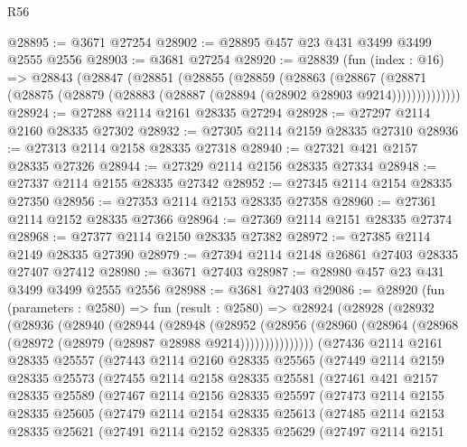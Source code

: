 \begin{lexlean}{R56}
\begin{coremodule}
@28895 := @3671 @27254
@28902 := @28895 @457 @23 @431 @3499 @3499 @2555 @2556
@28903 := @3681 @27254
@28920 := @28839
    (fun (index : @16) =>
    @28843
      (@28847
        (@28851
          (@28855
            (@28859
              (@28863
                (@28867
                  (@28871 (@28875 (@28879 (@28883 (@28887 (@28894 (@28902 @28903 @9214))))))))))))))
@28924 := @27288 @2114 @2161 @28335 @27294
@28928 := @27297 @2114 @2160 @28335 @27302
@28932 := @27305 @2114 @2159 @28335 @27310
@28936 := @27313 @2114 @2158 @28335 @27318
@28940 := @27321 @421 @2157 @28335 @27326
@28944 := @27329 @2114 @2156 @28335 @27334
@28948 := @27337 @2114 @2155 @28335 @27342
@28952 := @27345 @2114 @2154 @28335 @27350
@28956 := @27353 @2114 @2153 @28335 @27358
@28960 := @27361 @2114 @2152 @28335 @27366
@28964 := @27369 @2114 @2151 @28335 @27374
@28968 := @27377 @2114 @2150 @28335 @27382
@28972 := @27385 @2114 @2149 @28335 @27390
@28979 := @27394 @2114 @2148 @26861 @27403 @28335 @27407 @27412
@28980 := @3671 @27403
@28987 := @28980 @457 @23 @431 @3499 @3499 @2555 @2556
@28988 := @3681 @27403
@29086 := @28920
    (fun (parameters : @2580) =>
    fun (result : @2580) =>
    @28924
      (@28928
        (@28932
          (@28936
            (@28940
              (@28944
                (@28948
                  (@28952
                    (@28956
                      (@28960 (@28964 (@28968 (@28972 (@28979 (@28987 @28988 @9214)))))))))))))))
    (@27436
      @2114
      @2161
      @28335
      @25557
      (@27443
        @2114
        @2160
        @28335
        @25565
        (@27449
          @2114
          @2159
          @28335
          @25573
          (@27455
            @2114
            @2158
            @28335
            @25581
            (@27461
              @421
              @2157
              @28335
              @25589
              (@27467
                @2114
                @2156
                @28335
                @25597
                (@27473
                  @2114
                  @2155
                  @28335
                  @25605
                  (@27479
                    @2114
                    @2154
                    @28335
                    @25613
                    (@27485
                      @2114
                      @2153
                      @28335
                      @25621
                      (@27491
                        @2114
                        @2152
                        @28335
                        @25629
                        (@27497
                          @2114
                          @2151

\end{coremodule}
\end{lexlean}
